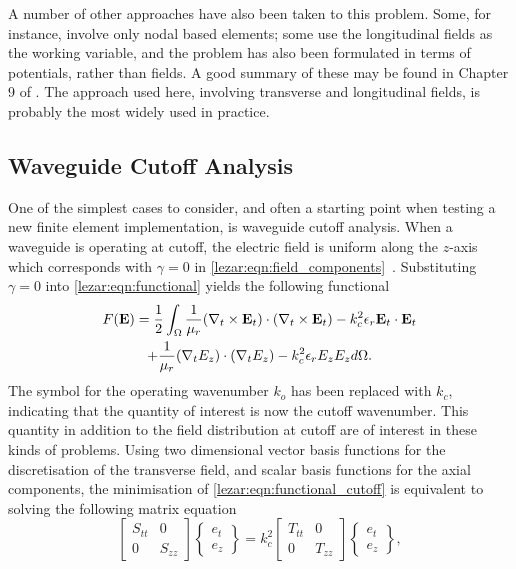 A number of other approaches have also been taken to this
problem. Some, for instance, involve only nodal based elements; some
use the longitudinal fields as the working variable, and the problem
has also been formulated in terms of potentials, rather than fields. A
good summary of these may be found in Chapter 9 of \cite{ZhuCan2006}. The approach used here, involving transverse and
longitudinal fields, is probably the most widely used in practice.

\subsection{Waveguide Cutoff Analysis}
\label{lezar:sec:cutoff_formulation}
One of the simplest cases to consider, and often a starting point when
testing a new finite element implementation, is waveguide cutoff
analysis. When a waveguide is operating at cutoff, the electric field
is uniform along the $z$-axis which corresponds with $\gamma = 0$ in
\eqref{lezar:eqn:field_components}~\cite{Pozar2005}.  Substituting $\gamma = 0$ into
\eqref{lezar:eqn:functional} yields the following functional
\begin{multline}
    \label{lezar:eqn:functional_cutoff}
    F(\mathbf{E}) = \frac{1}{2}\int_{\Omega}\frac{1}{\mu_r}(\curl{\mathbf{E}_t}{t})\cdot(\curl{\mathbf{E}_t}{t}) -k_c^2\epsilon_r\mathbf{E}_t\cdot{\mathbf{E}_t}\\
    +\frac{1}{\mu_r}(\nabla_t{E_z})\cdot(\nabla_t{E_z})
    -k_c^2\epsilon_r E_z{E_z} d\Omega.
\end{multline}
The symbol for the operating wavenumber
$k_o$ has been replaced with $k_c$, indicating that the
quantity of interest is now the cutoff
wavenumber. This quantity in addition to the
field distribution at cutoff are of interest in these kinds of
problems.  Using two dimensional vector basis functions for the
discretisation of the transverse field, and scalar basis functions for
the axial components, the minimisation of
\eqref{lezar:eqn:functional_cutoff} is equivalent to solving the following
matrix equation
\begin{equation}
    \label{lezar:eqn:matrix_equation_cutoff}
    \begin{bmatrix} S_{tt} & 0\\0 &
    S_{zz}\end{bmatrix}\begin{Bmatrix}e_t\\e_z\end{Bmatrix} =
    k_c^2\begin{bmatrix} T_{tt} & 0\\0 &
    T_{zz}\end{bmatrix}\begin{Bmatrix}e_t\\e_z\end{Bmatrix},
\end{equation}
